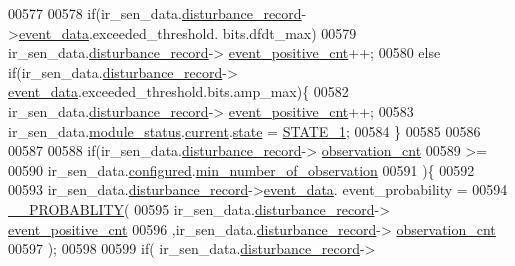 \begin{DoxyCode}
00577 
00578             \textcolor{keywordflow}{if}(ir\_sen\_data.\hyperlink{a00023_ac9b38e2c1d3f1013a88d33506c754152}{disturbance\_record}->\hyperlink{a00028_a8c0bda69e71ef674e60da47ad0be9ab0}{event\_data}.exceeded\_threshold.
      bits.dfdt\_max)
00579                ir\_sen\_data.\hyperlink{a00023_ac9b38e2c1d3f1013a88d33506c754152}{disturbance\_record}->
      \hyperlink{a00028_a7397b9d76d4b57500f27bb23d258a18a}{event\_positive\_cnt}++;
00580             \textcolor{keywordflow}{else}  \textcolor{keywordflow}{if}(ir\_sen\_data.\hyperlink{a00023_ac9b38e2c1d3f1013a88d33506c754152}{disturbance\_record}->
      \hyperlink{a00028_a8c0bda69e71ef674e60da47ad0be9ab0}{event\_data}.exceeded\_threshold.bits.amp\_max)\{
00582                ir\_sen\_data.\hyperlink{a00023_ac9b38e2c1d3f1013a88d33506c754152}{disturbance\_record}->
      \hyperlink{a00028_a7397b9d76d4b57500f27bb23d258a18a}{event\_positive\_cnt}++;
00583                ir\_sen\_data.\hyperlink{a00023_a5a53c391562b059eb744ac679f3765ca}{module\_status}.\hyperlink{a00017_ab8af48cdbba92b3ae39c4470e53af944}{current}.\hyperlink{a00017_a6b8d8e916bc56265a3fd279bd26b6d1b}{state} = 
      \hyperlink{a00021_a727351838367f27ac0adb9a13422c342}{STATE\_1};
00584             \}
00585 
00586 
00587 
00588                \textcolor{keywordflow}{if}(ir\_sen\_data.\hyperlink{a00023_ac9b38e2c1d3f1013a88d33506c754152}{disturbance\_record}->
      \hyperlink{a00028_ad5b0bac02ce266b91b2b52a1c3ea1d78}{observation\_cnt}
00589                 >=
00590                 ir\_sen\_data.\hyperlink{a00023_a94b2d1f6ea4ab334c74d24984dd27843}{configured}.\hyperlink{a00021_ae8665e8bf422c1482442d6949ba28408}{min\_number\_of\_observation}
00591                )\{
00592 
00593                     ir\_sen\_data.\hyperlink{a00023_ac9b38e2c1d3f1013a88d33506c754152}{disturbance\_record}->\hyperlink{a00028_a8c0bda69e71ef674e60da47ad0be9ab0}{event\_data}.
      event\_probability =
00594                           \hyperlink{a00021_ab2185512402ea26115af112ce48175b2}{\_\_PROBABLITY}(
00595                            ir\_sen\_data.\hyperlink{a00023_ac9b38e2c1d3f1013a88d33506c754152}{disturbance\_record}->
      \hyperlink{a00028_a7397b9d76d4b57500f27bb23d258a18a}{event\_positive\_cnt}
00596                           ,ir\_sen\_data.\hyperlink{a00023_ac9b38e2c1d3f1013a88d33506c754152}{disturbance\_record}->
      \hyperlink{a00028_ad5b0bac02ce266b91b2b52a1c3ea1d78}{observation\_cnt}
00597                            );
00598 
00599                    \textcolor{keywordflow}{if}( ir\_sen\_data.\hyperlink{a00023_ac9b38e2c1d3f1013a88d33506c754152}{disturbance\_record}->

\end{DoxyCode}
